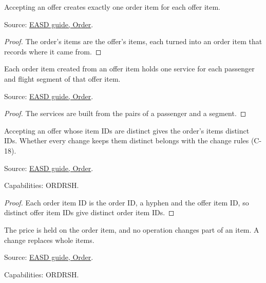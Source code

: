 \begin{theorem}
  \label{thm:c02-item-per-offer-item}
  Accepting an offer creates exactly one order item for each offer item.

  Source: \href{https://standards.atlassian.net/wiki/spaces/EASD/pages/574849062/Order}{EASD guide, Order}.
\end{theorem}
\begin{proof}
  The order's items are the offer's items, each turned into an order item that
  records where it came from.
\end{proof}

\begin{theorem}
  \label{thm:one-services-per-passenger-segment}
  Each order item created from an offer item holds one service for each
  passenger and flight segment of that offer item.

  Source: \href{https://standards.atlassian.net/wiki/spaces/EASD/pages/574849062/Order}{EASD guide, Order}.
\end{theorem}
\begin{proof}
  The services are built from the pairs of a passenger and a segment.
\end{proof}

\begin{theorem}
  \label{thm:c03-unique-item-ids}
  Accepting an offer whose item IDs are distinct gives the order's items
  distinct IDs.  Whether every change keeps them distinct belongs with the
  change rules (C-18).

  Source: \href{https://standards.atlassian.net/wiki/spaces/EASD/pages/574849062/Order}{EASD guide, Order}.

  Capabilities: ORDRSH.
\end{theorem}
\begin{proof}
  Each order item ID is the order ID, a hyphen and the offer item ID, so
  distinct offer item IDs give distinct order item IDs.
\end{proof}

\begin{theorem}
  \label{thm:c04-item-unsplit}
  The price is held on the order item, and no operation changes part of an
  item.  A change replaces whole items.

  Source: \href{https://standards.atlassian.net/wiki/spaces/EASD/pages/574849062/Order}{EASD guide, Order}.

  Capabilities: ORDRSH.
\end{theorem}

